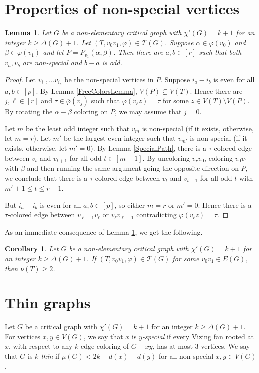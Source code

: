 \documentclass[12pt]{amsart}
\theoremstyle{plain}
\newtheorem{lem}[thm]{Lemma}
\newtheorem{cor}[thm]{Corollary}
\theoremstyle{definition}
\theoremstyle{remark}
\newcommand{\fancy}[1]{\mathcal{#1}}
\newcommand{\T}{\fancy{T}}
\newcommand{\irange}[1]{\left[#1\right]}
\newcommand{\vph}{\varphi}
\newcommand{\vphn}{\overline{\varphi}}
\begin{document}
\section{Properties of non-special vertices}
\begin{lem}\label{OddDistanceNonSpecialsExist}
Let $G$ be a non-elementary critical graph with $\chi'(G) = k+1$ for an integer $k \ge \Delta(G) + 1$.
Let $(T, v_0v_1, \vph) \in \T(G)$. Suppose $\alpha \in \vphn(v_0)$ and $\beta \in \vphn(v_1)$ and let $P = P_{v_1}(\alpha, \beta)$.  Then there
are $a,b \in \irange{r}$ such that both $v_a, v_b$ are non-special and $b - a$ is odd.
\end{lem}
\begin{proof}
Let $v_{i_1}, \ldots v_{i_p}$ be the non-special vertices in $P$. Suppose $i_a - i_b$ is even for all $a,b \in \irange{p}$.  
By Lemma \ref{FreeColorsLemma}, $V(P) \subsetneq V(T)$. Hence there are $j,\ell \in \irange{r}$ and $\tau \in \vphn(v_j)$ such that $\vph(v_\ell z) = \tau$ for some $z \in V(T) \setminus V(P)$.
By rotating the $\alpha-\beta$ coloring on $P$, we may assume that $j=0$.

Let $m$ be the least odd integer such that $v_m$ is non-special (if it exists, otherwise, let $m=r$).
Let $m'$ be the largest even integer such that $v_{m'}$ is non-special (if it exists, otherwise, let $m'=0$).
By Lemma \ref{SpecialPath}, there is a $\tau$-colored edge between $v_t$ and $v_{t+1}$ for all odd $t \in \irange{m-1}$.
By uncoloring $v_rv_0$, coloring $v_0v_1$ with $\beta$ and then running the same argument going the opposite direction on $P$, we conclude that 
there is a $\tau$-colored edge between $v_t$ and $v_{t+1}$ for all odd $t$ with $m' + 1 \le t \le r-1$.

But $i_a - i_b$ is even for all $a,b \in \irange{p}$, so either $m=r$ or $m'=0$.  Hence there is a $\tau$-colored edge between $v_{\ell-1} v_{\ell}$ or $v_{\ell} v_{\ell + 1}$ contradicting $\vph(v_\ell z) = \tau$.
\end{proof}

As an immediate consequence of Lemma \ref{OddDistanceNonSpecialsExist}, we get the following.

\begin{cor}\label{AtMostOneNonSpecial}
Let $G$ be a non-elementary critical graph with $\chi'(G) = k+1$ for an integer $k \ge \Delta(G) + 1$.
If $(T, v_0v_1, \vph) \in \T(G)$ for some $v_0v_1 \in E(G)$, then $\nu(T) \ge 2$.
\end{cor}

\section{Thin graphs}
Let $G$ be a critical graph with $\chi'(G) = k+1$ for an integer $k \ge \Delta(G) + 1$.
For vertices $x,y \in V(G)$, we say that $x$ is \emph{$y$-special} if every Vizing fan rooted at $x$, with respect to any $k$-edge-coloring of $G-xy$, has at most 3 vertices.
We say that $G$ is \emph{$k$-thin} if $\mu(G) < 2k - d(x) - d(y)$ for all non-special $x,y \in V(G)$.
\end{document}

